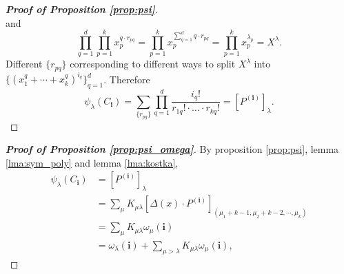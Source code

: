 \documentclass[11pt]{homework}
\begin{document}
\begin{proof}[\normalfont\bfseries Proof of Proposition \ref{prop:psi}]
\begin{equation*}
    \end{equation*}
    and 
    \begin{equation*}
        \prod_{q=1}^d \prod_{p=1}^k x_p^{q \cdot r_{pq}} = \prod_{p=1}^k x_p^{\sum_{q=1}^d q \cdot r_{pq}} = \prod_{p=1}^k x_p^{\lambda_p} = X^{\lambda}.
    \end{equation*}
    Different $\{r_{pq}\}$ corresponding to different ways to split $X^{\lambda}$ into $\{(x_1^q + \cdots + x_k^q)^{i_q}\}_{q=1}^d$.
    Therefore 
    \begin{equation*}
        \psi_{\lambda}(C_\mathbf{i}) = \sum_{\{r_{pq}\}} \prod_{q=1}^d \frac{i_q!}{r_{1q}! \cdot \ldots \cdot r_{kq}!} = \left[P^{(\mathbf{i})}\right]_\lambda.
    \end{equation*}
\end{proof}

\begin{proof}[\normalfont\bfseries Proof of Proposition \ref{prop:psi_omega}]
    By proposition \ref{prop:psi}, lemma \ref{lma:sym_poly} and lemma \ref{lma:kostka}, 
    \begin{align*}
        \psi_{\lambda}(C_\mathbf{i}) &= \left[P^{(\mathbf{i})} \right]_\lambda \\
        &= \sum_{\mu} K_{\mu \lambda} \left[\Delta(x) \cdot P^{(\mathbf{i})} \right]_{(\mu_1 + k - 1, \mu_2 + k - 2, \cdots , \mu_k)} \\
        &= \sum_{\mu} K_{\mu\lambda} \omega_\mu(\mathbf{i}) \\
        &= \omega_\lambda(\mathbf{i}) + \sum_{\mu > \lambda} K_{\mu\lambda} \omega_\mu(\mathbf{i}) ,
    \end{align*}
\end{proof}
\end{document}
